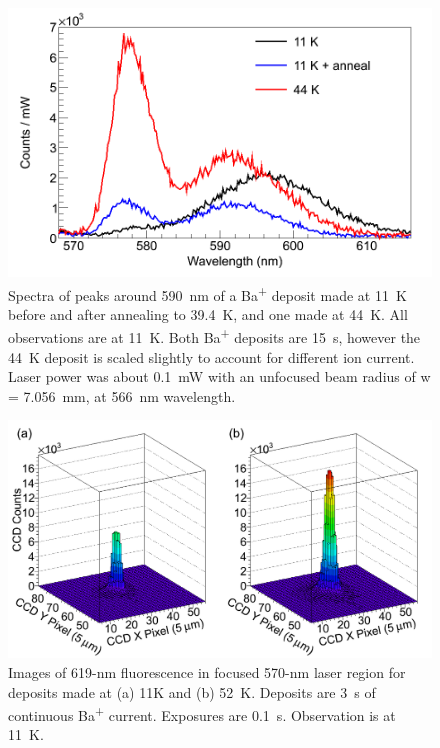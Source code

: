 \begin{figure} %
        \centering
                \includegraphics[width=.7\textwidth]{figures/spectra_temperature_conditions.png}
                \caption{Spectra of peaks around 590~nm of a Ba\textsuperscript{+} deposit made at 11~K before and after annealing to 39.4~K, and one made at 44~K.  All observations are at 11~K.  Both Ba\textsuperscript{+} deposits are 15~s, however the 44~K deposit is scaled slightly to account for different ion current.  Laser power was about 0.1~mW with an unfocused beam radius of w = 7.056~mm, at 566~nm wavelength.}
\label{fig:specTempConditions}
\end{figure}

\begin{figure} [h]
        \centering
                \includegraphics[width=.8\textwidth]{figures/619_deposit_temp.png}
                \caption{Images of 619-nm fluorescence in focused 570-nm laser region for deposits made at (a) 11K and (b) 52~K.  Deposits are 3~s of continuous Ba\textsuperscript{+} current.  Exposures are 0.1~s.  Observation is at 11~K.}
\label{fig:specTempConditions619}
\end{figure}

